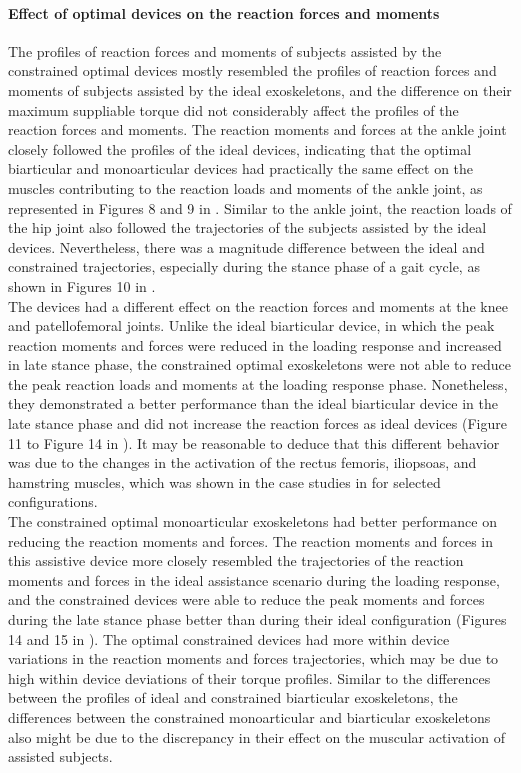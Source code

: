 \documentclass[10pt,letterpaper]{article}
\begin{document}
\paragraph{Effect of optimal devices on the reaction forces and moments} The profiles of reaction forces and moments of subjects assisted by the constrained optimal devices mostly resembled the profiles of reaction forces and moments of subjects assisted by the ideal exoskeletons, and the difference on their maximum suppliable torque did not considerably affect the profiles of the reaction forces and moments. The reaction moments and forces at the ankle joint closely followed the profiles of the ideal devices, indicating that the optimal biarticular and monoarticular devices had practically the same effect on the muscles contributing to the reaction loads and moments of the ankle joint, as represented in Figures 8 and 9 in .  Similar to the ankle joint, the reaction loads of the hip joint also followed the trajectories of the subjects assisted by the ideal devices. Nevertheless, there was a magnitude difference between the ideal and constrained trajectories, especially during the stance phase of a gait cycle, as shown in Figures 10 in .\\
The devices had a different effect on the reaction forces and moments at the knee and patellofemoral joints. Unlike the ideal biarticular device, in which the peak reaction moments and forces were reduced in the loading response and increased in late stance phase, the constrained optimal exoskeletons were not able to reduce the peak reaction loads and moments at the loading response phase. Nonetheless, they demonstrated a better performance than the ideal biarticular device in the late stance phase and did not increase the reaction forces as ideal devices (Figure 11 to Figure 14 in ). It may be reasonable to deduce that this different behavior was due to the changes in the activation of the rectus femoris, iliopsoas, and hamstring muscles, which was shown in the case studies in  for selected configurations.\\
The constrained optimal monoarticular exoskeletons had better performance on reducing the reaction moments and forces. The reaction moments and forces in this assistive device more closely resembled the trajectories of the reaction moments and forces in the ideal assistance scenario during the loading response, and the constrained devices were able to reduce the peak moments and forces during the late stance phase better than during their ideal configuration (Figures 14 and 15 in ). The optimal constrained devices had more within device variations in the reaction moments and forces trajectories, which may be due to high within device deviations of their torque profiles. Similar to the differences between the profiles of ideal and constrained biarticular exoskeletons, the differences between the constrained monoarticular and biarticular exoskeletons also might be due to the discrepancy in their effect on the muscular activation of assisted subjects.
\end{document}
